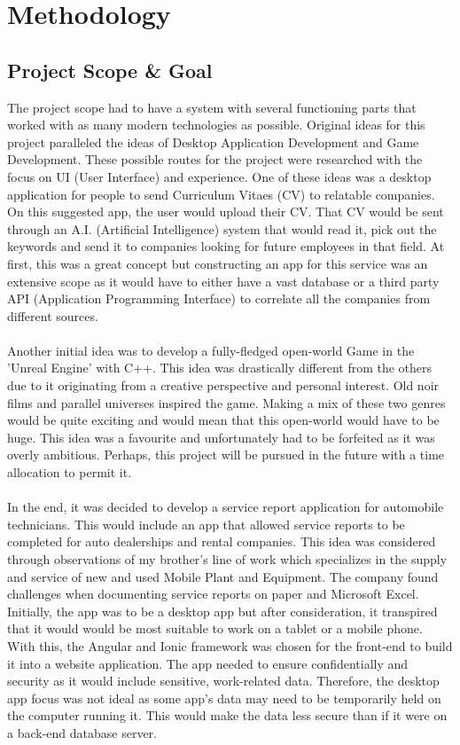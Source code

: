 \chapter{Methodology}
\section{Project Scope \& Goal}
The project scope had to have a system with several functioning parts that worked with as many modern technologies as possible. Original ideas for this project paralleled the ideas of Desktop Application Development and Game Development. These possible routes for the project were researched with the focus on UI (User Interface) and experience. One of these ideas was a desktop application for people to send Curriculum Vitaes (CV) to relatable companies. On this suggested app, the user would upload their CV. That CV would be sent through an A.I. (Artificial Intelligence) system that would read it, pick out the keywords and send it to companies looking for future employees in that field. At first, this was a great concept but constructing an app for this service was an extensive scope as it would have to either have a vast database or a third party API (Application Programming Interface) to correlate all the companies from different sources.
\\\\ Another initial idea was to develop a fully-fledged open-world Game in the 'Unreal Engine' with C++. This idea was drastically different from the others due to it originating from a creative perspective and personal interest. Old noir films and parallel universes inspired the game. Making a mix of these two genres would be quite exciting and would mean that this open-world would have to be huge. This idea was a favourite and unfortunately had to be forfeited as it was overly ambitious. Perhaps, this project will be pursued in the future with a time allocation to permit it. 
\\\\ In the end, it was decided to develop a service report application for automobile technicians. This would include an app that allowed service reports to be completed for auto dealerships and rental companies. This idea was considered through observations of my brother's line of work which specializes in the supply and service of new and used Mobile Plant and Equipment. The company found challenges when documenting service reports on paper and Microsoft Excel. Initially, the app was to be a desktop app but after consideration, it transpired that it would would be most suitable to work on a tablet or a mobile phone. With this, the Angular and Ionic framework was chosen for the front-end to build it into a website application. The app needed to ensure confidentially and security as it would include sensitive, work-related data. Therefore, the desktop app focus was not ideal as some app's data may need to be temporarily held on the computer running it. This would make the data less secure than if it were on a back-end database server. \cite{ref1}
